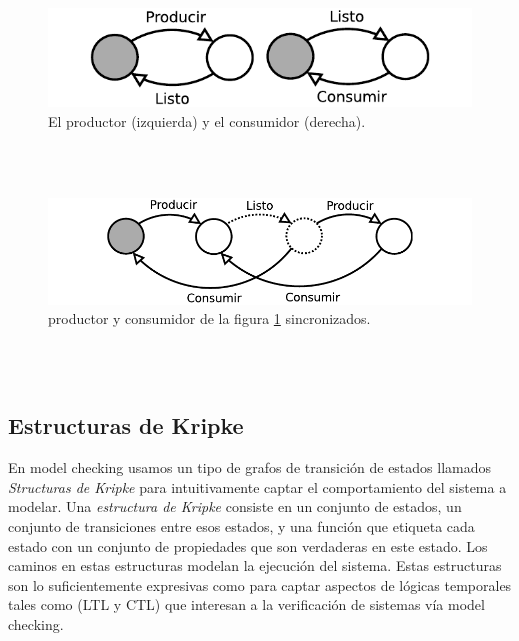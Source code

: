 \documentclass[titlepage, 12pt]{book}
\begin{document}
\begin{figure}[H] %
  \centering
    \includegraphics{Imagenes/prodYcons.pdf}
  \caption{El productor (izquierda) y el consumidor (derecha).}
  \label{figura1}
\end{figure}
~\\\\

\begin{figure}[H] %
  \centering
    \includegraphics{Imagenes/prodYconsSincro.pdf}
  \caption{productor y consumidor de la figura \ref{figura1} sincronizados.}
  \label{figura2}
\end{figure}
~\\\\

\subsection{Estructuras de Kripke}
En model checking usamos un tipo de grafos de transici\'on de estados llamados \textit{Structuras de Kripke} para intuitivamente captar el comportamiento del sistema a modelar. Una \textit{estructura de Kripke} consiste en un conjunto de estados, un conjunto de transiciones entre esos estados, y una funci\'on que etiqueta cada estado con un conjunto de propiedades que son verdaderas en este estado. Los caminos en estas estructuras modelan la ejecuci\'on del sistema\cite{Clarke}. Estas estructuras son lo suficientemente expresivas como para captar aspectos de l\'ogicas temporales tales como (LTL y CTL) que interesan a la verificaci\'on de sistemas v\'ia model checking.\\
\end{document}
